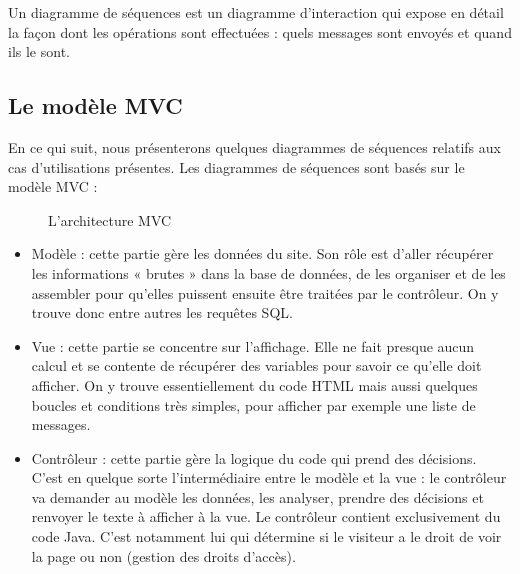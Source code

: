 Un diagramme de séquences est un diagramme d'interaction qui expose en détail la façon dont les opérations sont effectuées : quels messages sont envoyés et quand ils le sont.

\subsection{Le modèle MVC}
En ce qui suit, nous présenterons quelques diagrammes de séquences relatifs aux cas d’utilisations présentes.
Les diagrammes de séquences sont basés sur le modèle MVC :
\begin{figure}
    \centering
    \caption{L'architecture MVC}
    
\end{figure}

\begin{itemize}
\item Modèle : cette partie gère les données du site. Son rôle est d'aller récupérer les informations « brutes » dans la base de données, de les organiser et de les assembler pour qu'elles puissent ensuite être traitées par le contrôleur. On y trouve donc entre autres les requêtes SQL.
\item Vue : cette partie se concentre sur l'affichage. Elle ne fait presque aucun calcul et se contente de récupérer des variables pour savoir ce qu'elle doit afficher. On y trouve essentiellement du code HTML mais aussi quelques boucles et conditions très simples, pour afficher par exemple une liste de messages.
\item Contrôleur : cette partie gère la logique du code qui prend des décisions. C'est en quelque sorte l'intermédiaire entre le modèle et la vue : le contrôleur va demander au modèle les données, les analyser, prendre des décisions et renvoyer le texte à afficher à la vue. Le contrôleur contient exclusivement du code Java. C'est notamment lui qui détermine si le visiteur a le droit de voir la page ou non (gestion des droits d'accès).
\end{itemize}


